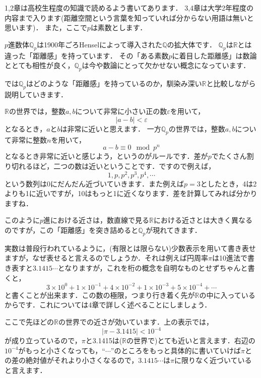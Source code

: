 \documentclass[./main]{subfiles}
\begin{document}
 

\theoremstyle{definition} 
\newtheorem{theo}{Thm}[section]
\newtheorem{defi}[theo]{Def}
\newtheorem{prop}[theo]{Prop}
\newcommand{\N}{\mathbb{N}}%
\newcommand{\Z}{\mathbb{Z}}%
\newcommand{\Q}{\mathbb{Q}}%
\newcommand{\Qp}{\mathbb{Q}_p}%
\newcommand{\R}{\mathbb{R}}%
\newcommand{\abs}[1]{\left\lvert#1\right\rvert}%


1,2章は高校生程度の知識で読めるよう書いてあります．
3,4章は大学2年程度の内容まで入ります(距離空間という言葉を知っていれば分からない用語は無いと思います)．
また，ここで$p$は素数とします．


$p$進数体$\Qp$は1900年ごろHenselによって導入された$\Q$の拡大体です．
$\Qp$は$\R$とは違った「距離感」を持っています．
その「ある素数$p$に着目した距離感」は数論ととても相性が良く，$\Qp$は今や数論にとって欠かせない概念になっています．

では$\Qp$はどのような「距離感」を持っているのか，馴染み深い$\R$と比較しながら説明していきます．

$\R$の世界では，整数$a,b$について非常に小さい正の数$\varepsilon$を用いて，
\[
\abs{a-b}<\varepsilon
\]
となるとき，$a$と$b$は非常に近いと思えます．
一方$\Qp$の世界では，整数$a,b$について非常に整数$n$を用いて，
\[
a-b \equiv 0 \mod{p^n}
\]
となるとき非常に近いと感じよう，というのがルールです．差が$p$でたくさん割り切れるほど，二つの数は近いということです．ですので例えば，
\[
1,p,p^2,p^3,p^4,\cdots
\]
という数列は0にだんだん近づいていきます．また例えば$p=3$としたとき，4は2よりも1に近いですが，10はもっと1に近くなります．差を計算してみれば分かりますね．

このように$p$進における近さは，数直線で見る$\R$における近さとは大きく異なるのですが，この「距離感」を突き詰めると$\Qp$が現れてきます．


\Section{$p$進展開で$\Qp$を定めよう}

実数は普段行われているように，(有限とは限らない)少数表示を用いて書き表せますが，なぜ表せると言えるのでしょうか．それは例えば円周率$\pi$は10進法で書き表すと$3.1415\cdots$となりますが，これを桁の概念を自明なものとせずちゃんと書くと，
\[
3 \times 10^0 + 1 \times 10^{-1} + 4 \times 10^{-2} + 1\times 10^{-3} + 5 \times 10^{-4}+ \cdots
\]
と書くことが出来ます．この数の極限，つまり行き着く先が$\R$の中に入っているからです．これについては4章で詳しく述べることにしましょう．

ここで先ほどの$\R$の世界での近さが効いています．上の表示では，
\[
\abs{\pi-3.1415}<10^{-4}
\]
が成り立っているので，$\pi$と3.1415は($\R$の世界で)とても近いと言えます．右辺の$10^{-4}$がもっと小さくなっても，``$\cdots$''のところをもっと具体的に書いていけば$\pi$との差の絶対値がそれより小さくなるので，$3.1415\cdots$は$\pi$に限りなく近づいていると言えます．
\end{document}
